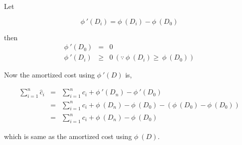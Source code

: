 \newcommand\phidash[1]{\ensuremath{\phi\ '(#1)}}
\newcommand\phif[1]{\ensuremath{\phi\ (#1)}}
\newcommand\amcost{\ensuremath{\hat{c}_i}}
\newcommand\accost{\ensuremath{c_i}}

Let

\begin{displaymath}
\phidash{D_i} = \phif{D_i} - \phif{D_0}
\end{displaymath}

then
\begin{eqnarray*}
\phidash{D_0} &=& 0 \\
\phidash{D_i} &\geq& 0 \ (\because\ \phif{D_i} \geq\ \phif{D_0})
\end{eqnarray*}

Now the amortized cost using \phidash{D} is,

\begin{eqnarray*}
\sum_{i=1}^{n} \amcost &=& \sum_{i=1}^{n} \accost + \phidash{D_n} -
\phidash{D_0} \\
&=& \sum_{i=1}^{n} \accost + \phif{D_n} - \phif{D_0} - 
( \phif{D_0} - \phif{D_0}) \\
&=& \sum_{i=1}^{n} \accost + \phif{D_n} - \phif{D_0}
\end{eqnarray*}

which is same as the amortized cost using \phif{D}.
